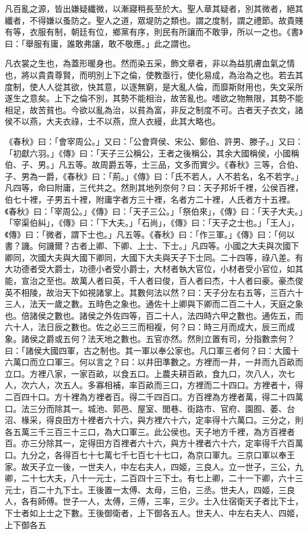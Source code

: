凡百亂之源，皆出嫌疑纖微，以漸寢稍長至於大。聖人章其疑者，別其微者，絕其纖者，不得嫌以蚤防之。聖人之道，眾堤防之類也。謂之度制，謂之禮節。故貴賤有等，衣服有制，朝廷有位，鄉黨有序，則民有所讓而不敢爭，所以一之也。《書》曰：「舉服有庸，誰敢弗讓，敢不敬應。」此之謂也。


凡衣裳之生也，為蓋形暖身也。然而染五采，飾文章者，非以為益肌膚血氣之情也，將以貴貴尊賢，而明別上下之倫，使教亟行，使化易成，為治為之也。若去其度制，使人人從其欲，快其意，以逐無窮，是大亂人倫，而靡斯財用也，失文采所遂生之意矣。上下之倫不別，其勢不能相治，故苦亂也。嗜欲之物無限，其勢不能相足，故苦貧也。今欲以亂為治，以貧為富，非反之制度不可。古者天子衣文，諸侯不以燕，大夫衣祿，士不以燕，庶人衣縵，此其大略也。




《春秋》曰：「會宰周公。」又曰：「公會齊侯、宋公、鄭伯、許男、滕子。」又曰：「初獻六羽。」《傳》曰：「天子三公稱公，王者之後稱公，其余大國稱侯，小國稱伯、子、男。」凡五等。故周爵五等，士三品，文多而實少。《春秋》三等，合伯、子、男為一爵，《春秋》曰：「荊。」《傳》曰：「氏不若人，人不若名，名不若字。」凡四等，命曰附庸，三代共之。然則其地列奈何？曰：天子邦圻千裡，公侯百裡，伯七十裡，子男五十裡，附庸字者方三十裡，名者方二十裡，人氏者方十五裡。《春秋》曰：「宰周公。」《傳》曰：「天子三公。」「祭伯來」，《傳》曰：「天子大夫。」「宰渠伯糾」，《傳》曰：「下大夫。」「石尚」，《傳》曰：「天子之士也。」「王人」，《傳》曰：「微者，謂下士也。」凡五等。《春秋》曰：「作三軍。」《傳》曰：「何以書？譏。何譏爾？古者上卿、下卿、上士、下士。」凡四等。小國之大夫與次國下卿同，次國大夫與大國下卿同，大國下大夫與天子下士同。二十四等，祿八差。有大功德者受大爵士，功德小者受小爵士，大材者執大官位，小材者受小官位，如其能，宣治之至也。故萬人者曰英，千人者曰俊，百人者曰杰，十人者曰豪。豪杰俊英不相陵，故治天下如視諸掌上。其數何法以然？曰：天子分左右五等，三百六十三人，法天一歲之數。五時色之象也。通佐十上卿與下卿而二百二十人，天庭之象也。倍諸侯之數也。諸侯之外佐四等，百二十人，法四時六甲之數也。通佐五，而六十人，法日辰之數也。佐之必三三而相複，何？曰：時三月而成大，辰三而成象。諸侯之爵或五何？法天地之數也。五官亦然。然則立置有司，分指數柰何？曰：「諸侯大國四軍，古之制也。其一軍以奉公家也。凡口軍三者何？曰：大國十六萬口而立口軍三。何以言之？曰：以井田準數之。方裡而一井，一井而九百畝而立口。方裡八家，一家百畝，以食五口。上農夫耕百畝，食九口，次八人，次七人，次六人，次五人。多寡相補，率百畝而三口，方裡而二十四口。方裡者十，得二百四十口。方十裡為方裡者百。得二千四百口。方百裡為方裡者萬，得二十四萬口。法三分而除其一。城池、郭邑、屋室、閭巷、街路市、官府、園囿、萎、台沼、椽采，得良田方十裡者六十六，與方裡六十六，定率得十六萬口。三分之，則各五萬三千三百三十三口，為大口軍三。此公侯也。天子地方千裡，為方百裡者百。亦三分除其一，定得田方百裡者六十六，與方十裡者六十六，定率得千六百萬口。九分之，各得百七十七萬七千七百七十七口，為京口軍九。三京口軍以奉王家。故天子立一後，一世夫人，中左右夫人，四姬，三良人。立一世子，三公，九卿，二十七大夫，八十一元士，二百四十三下士。有七上卿，二十一下卿，六十三元士，百二十九下士。王後置一太傅、太母，三伯，三丞。世夫人，四姬，三良人，各有師傅。世子一人，太傅，三傅，三率，三少。士入仕宿衛天子者比下士，下士者如上士之下數。王後御衛者，上下御各五人。世夫人、中左右夫人、四姬，上下御各五